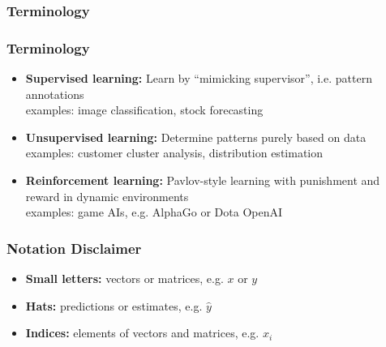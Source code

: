 \documentclass[aspectratio=169]{beamer}
\begin{document}
\begin{frame}
    \frametitle{Terminology}
    \begin{figure}
        \centering
    \end{figure}
\end{frame}

\begin{frame}
\frametitle{Terminology}
    \begin{itemize}
        \item \textbf{Supervised learning:} Learn by ``mimicking supervisor'', i.e. pattern annotations\\ 
        examples: image classification, stock forecasting
        \item \textbf{Unsupervised learning:} Determine patterns purely based on data\\ examples: customer cluster analysis, distribution estimation
        \item \textbf{Reinforcement learning:} Pavlov-style learning with punishment and reward in dynamic environments\\
        examples: game AIs, e.g. AlphaGo or Dota OpenAI
    \end{itemize}

    \medskip
\end{frame}

\begin{frame}
\frametitle{Notation Disclaimer}
\begin{itemize}
    \item \textbf{Small letters:} vectors or matrices, e.g. $x$ or $y$
    \item \textbf{Hats:} predictions or estimates, e.g. $\hat{y}$
    \item \textbf{Indices:} elements of vectors and matrices, e.g. $x_{i}$
\end{itemize}

\medskip
\end{frame}
\end{document}

